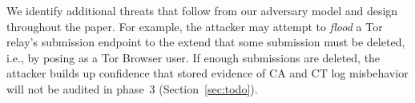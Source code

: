 %
%
We identify additional threats that follow from our adversary model and
design throughout the paper.  For example, the attacker may attempt to
\emph{flood} a Tor relay's submission endpoint to the extend that some
submission must be deleted, i.e., by posing as a Tor Browser user.  If enough
submissions are deleted, the attacker builds up confidence that stored evidence
of CA and CT log misbehavior will not be audited in phase~3
(Section~\ref{sec:todo}).


